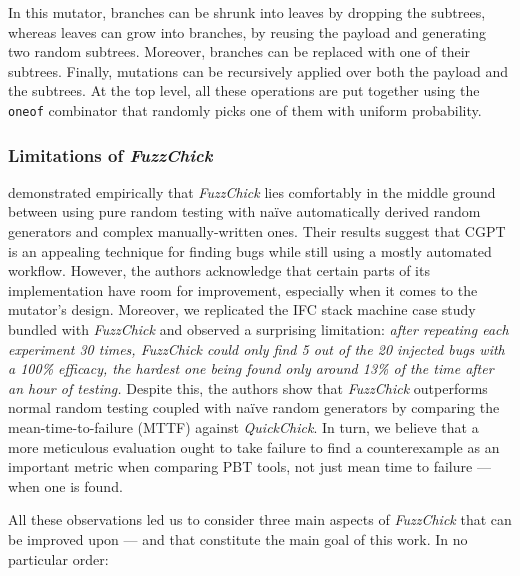 \documentclass[acmsmall, anonymous]{acmart}
\newcommand{\fuzzchick}{\textit{FuzzChick}\xspace}
\begin{document}


In this mutator, branches can be shrunk into leaves by dropping the subtrees,
whereas leaves can grow into branches, by reusing the payload and generating two
random subtrees.
%
Moreover, branches can be replaced with one of their subtrees.
%
Finally, mutations can be recursively applied over both the payload and the
subtrees.
%
At the top level, all these operations are put together using the \texttt{oneof}
combinator that randomly picks one of them with uniform probability.

%
%
\subsubsection{Limitations of \fuzzchick}

\citeauthor{lampropoulos2019coverage} demonstrated empirically that \fuzzchick
lies comfortably in the middle ground between using pure random testing with
na\"ive automatically derived random generators and complex manually-written
ones.
%
Their results suggest that CGPT is an appealing technique for finding bugs while
still using a mostly automated workflow.
%
However, the authors acknowledge that certain parts of its implementation have
room for improvement, especially when it comes to the mutator's design.
%
Moreover, we replicated the IFC stack machine case study bundled with \fuzzchick
and observed a surprising limitation:
%
\emph{after repeating each experiment 30 times, \fuzzchick could only find 5 out
  of the 20 injected bugs with a 100\% efficacy, the hardest one being found
  only around 13\% of the time after an hour of testing.}
%
Despite this, the authors show that \fuzzchick outperforms normal random testing
coupled with na\"ive random generators by comparing the mean-time-to-failure
(MTTF) against \emph{QuickChick}.
%
In turn, we believe that a more meticulous evaluation ought to take failure to find a
counterexample as an important metric when comparing PBT tools, not just mean
time to failure --- when one is found.
%


All these observations led us to consider three main aspects of \fuzzchick that
can be improved upon --- and that constitute the main goal of this work.
%
%
%
In no particular order:
\end{document}
